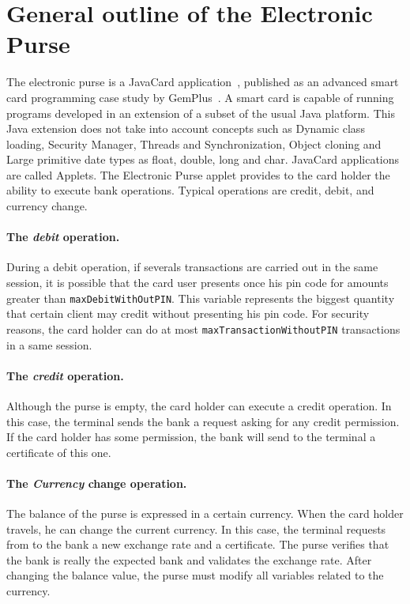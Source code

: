 \documentclass[a4paper]{llncs}
\begin{document}
\section{General outline of the Electronic Purse}
\label{SectGenPurse}

The electronic purse is a JavaCard application~\cite{SM99},
published as an advanced smart card programming case study
by GemPlus~\cite{PurseUrl}. A smart card
is capable of running programs developed in an extension
of a subset of the usual Java platform. This Java extension
does not take into account concepts such as Dynamic
class loading, Security Manager, Threads and
Synchronization, Object cloning and Large primitive
date types as float, double, long and char.
JavaCard applications are called Applets.
The Electronic Purse applet provides to
the card holder the ability to execute bank operations. Typical
operations are credit, debit, and currency change.

\paragraph{\bf The \textit{debit} operation.} During a debit
operation, if severals transactions are carried out in the same
session, it is possible that
the card user presents once his pin code for amounts greater than
\texttt{maxDebitWithOutPIN}. This variable
represents the biggest quantity that certain client may credit without
presenting his pin code. For
security reasons, the card holder can do at most
\texttt{maxTransactionWithoutPIN} transactions in a same session. 



\paragraph{\bf The \textit{credit} operation.} Although
the purse is empty, the
card holder can execute a credit operation. In this case, the terminal
sends the bank a request asking for any credit permission. If the card 
holder has some permission, the bank will send to the terminal a
certificate of this one.



\paragraph{\bf The \textit{Currency} change operation.} The balance
of the purse is expressed in a certain currency. When the card holder
travels, he can change the current currency. In this case, the
terminal requests from to the bank a
new exchange rate and a certificate. The purse verifies that the bank is 
really the expected bank and validates the exchange rate. After
changing the balance value, the purse must modify all variables related
to the currency. \\
\end{document}
